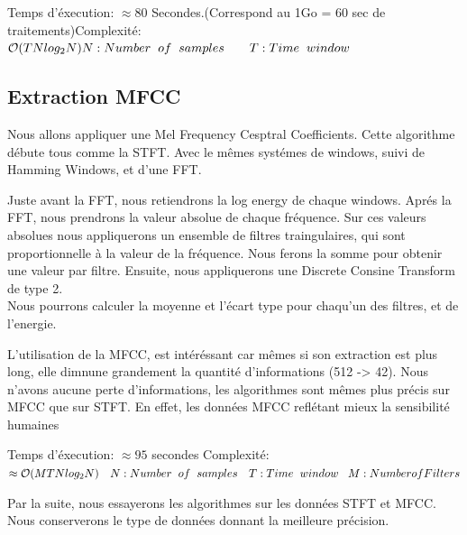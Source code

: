 \documentclass[10pt]{article}
\begin{document}
Temps d'éxecution: $\approx 80$ Secondes.(Correspond au 1Go = 60 sec de traitements)\qquad Complexité: $ \mathcal{O}(TN log_2 N) \\ N: Number \hspace{0.2cm} of \hspace{0.2cm} samples \qquad T:Time \hspace{0.2cm} window $

\subsection{Extraction MFCC}

Nous allons appliquer une Mel Frequency Cesptral Coefficients. Cette algorithme débute tous comme la STFT. Avec le mêmes systémes de windows, suivi de Hamming Windows, et d'une FFT. 

Juste avant la FFT, nous retiendrons la log energy de chaque windows. Aprés la FFT, nous prendrons la valeur absolue de chaque fréquence. Sur ces valeurs absolues nous appliquerons un ensemble de filtres traingulaires, qui sont proportionnelle à la valeur de la fréquence. Nous ferons la somme pour obtenir une valeur par filtre. Ensuite, nous appliquerons une Discrete Consine Transform de type 2.\\
Nous pourrons calculer la moyenne et l'écart type pour chaqu'un des filtres, et de l'energie.

L'utilisation de la MFCC, est intéréssant car mêmes si son extraction est plus long, elle dimnune grandement la quantité d'informations (512 -> 42). Nous n'avons aucune perte d'informations, les algorithmes sont mêmes plus précis sur MFCC que sur STFT. En effet, les données MFCC reflétant mieux la sensibilité humaines

Temps d'éxecution: $\approx 95$ secondes \quad Complexité: $\approx \mathcal{O}(MTN log_2 N) \quad N: Number \hspace{0.2cm} of \hspace{0.2cm} samples \quad T:Time \hspace{0.2cm}window \hspace{0.3cm} M: Number of Filters$ 

Par la suite, nous essayerons les algorithmes sur les données STFT et MFCC. Nous conserverons le type de données donnant la meilleure précision.



\end{document}
